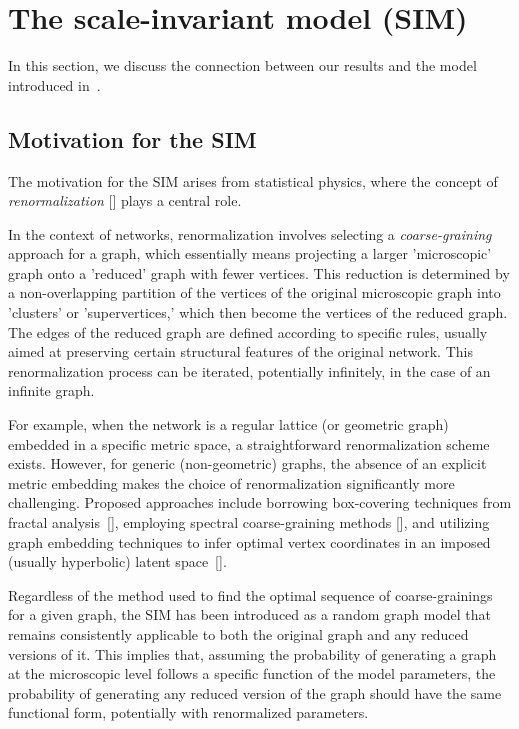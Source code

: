 \documentclass[11pt, reqno]{amsart}
\numberwithin{equation}{section}
\theoremstyle{plain} %
\theoremstyle{definition} %
\begin{document}
\section{The scale-invariant model (SIM)} \label{section: SIM}
In this section, we discuss the connection between our results and the model introduced in~\cite{GMD2020}.

\subsection{Motivation for the SIM}
The motivation for the SIM arises from statistical physics, where the concept of \emph{renormalization} [\cite{kadanoff2000statistical, wilson1983renormalization}] plays a central role.

In the context of networks, renormalization involves selecting a \emph{coarse-graining} approach for a graph, which essentially means projecting a larger 'microscopic' graph onto a 'reduced' graph with fewer vertices. This reduction is determined by a non-overlapping partition of the vertices of the original microscopic graph into 'clusters' or 'supervertices,' which then become the vertices of the reduced graph. The edges of the reduced graph are defined according to specific rules, usually aimed at preserving certain structural features of the original network. This renormalization process can be iterated, potentially infinitely, in the case of an infinite graph.

For example, when the network is a regular lattice (or geometric graph) embedded in a specific metric space, a straightforward renormalization scheme exists. However, for generic (non-geometric) graphs, the absence of an explicit metric embedding makes the choice of renormalization significantly more challenging. Proposed approaches include borrowing box-covering techniques from fractal analysis~[\cite{song2006origins, radicchi2009renormalization}], employing spectral coarse-graining methods [\cite{gfeller2007spectral, pablo}], and utilizing graph embedding techniques to infer optimal vertex coordinates in an imposed (usually hyperbolic) latent space~[\cite{garcia2018multiscale, boguna2021network}].

Regardless of the method used to find the optimal sequence of coarse-grainings for a given graph, the SIM has been introduced as a random graph model that remains consistently applicable to both the original graph and any reduced versions of it. This implies that, assuming the probability of generating a graph at the microscopic level follows a specific function of the model parameters, the probability of generating any reduced version of the graph should have the same functional form, potentially with renormalized parameters.
\end{document}
